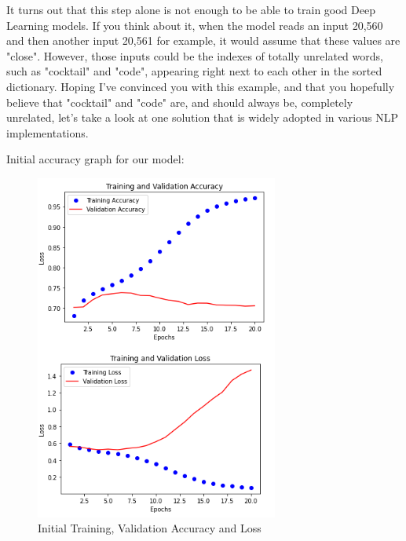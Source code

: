 \documentclass{article}
\begin{document}
It turns out that this step alone is not enough to be able to train good Deep Learning models. If you think about it, when the model reads an input 20,560 and then another input 20,561 for example, it would assume that these values are "close". However, those inputs could be the indexes of totally unrelated words, such as "cocktail" and "code", appearing right next to each other in the sorted dictionary. Hoping I've convinced you with this example, and that you hopefully believe that "cocktail" and "code" are, and should always be, completely unrelated, let's take a look at one solution that is widely adopted in various NLP implementations.

\newpage
Initial accuracy graph for our model:
\begin{figure}[h!]
    \centering
    \includegraphics[width=8cm]{validation.png}
    \caption{Initial Training, Validation Accuracy and Loss}
    \label{fig:vg1_label}
\end{figure}
\end{document}
